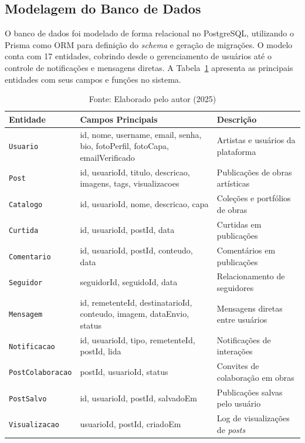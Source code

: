\documentclass[a4paper, 12pt, oneside]{article}
\begin{document}
\subsection{Modelagem do Banco de Dados}

O banco de dados foi modelado de forma relacional no PostgreSQL, utilizando o Prisma como ORM para definição do \textit{schema} e geração de migrações. O modelo conta com 17 entidades, cobrindo desde o gerenciamento de usuários até o controle de notificações e mensagens diretas. A Tabela~\ref{tab:entidades} apresenta as principais entidades com seus campos e funções no sistema.

\begin{table}[ht]
\centering
\caption{Principais entidades do banco de dados do Artlink}
\label{tab:entidades}
\begin{tabular}{lp{5.5cm}p{4cm}}
\toprule
\textbf{Entidade} & \textbf{Campos Principais} & \textbf{Descrição} \\
\midrule
\texttt{Usuario}         & id, nome, username, email, senha, bio, fotoPerfil, fotoCapa, emailVerificado & Artistas e usuários da plataforma \\
\texttt{Post}            & id, usuarioId, titulo, descricao, imagens, tags, visualizacoes & Publicações de obras artísticas \\
\texttt{Catalogo}        & id, usuarioId, nome, descricao, capa & Coleções e portfólios de obras \\
\texttt{Curtida}         & id, usuarioId, postId, data & Curtidas em publicações \\
\texttt{Comentario}      & id, usuarioId, postId, conteudo, data & Comentários em publicações \\
\texttt{Seguidor}        & seguidorId, seguidoId, data & Relacionamento de seguidores \\
\texttt{Mensagem}        & id, remetenteId, destinatarioId, conteudo, imagem, dataEnvio, status & Mensagens diretas entre usuários \\
\texttt{Notificacao}     & id, usuarioId, tipo, remetenteId, postId, lida & Notificações de interações \\
\texttt{PostColaboracao} & postId, usuarioId, status & Convites de colaboração em obras \\
\texttt{PostSalvo}       & id, usuarioId, postId, salvadoEm & Publicações salvas pelo usuário \\
\texttt{Visualizacao}    & usuarioId, postId, criadoEm & Log de visualizações de \textit{posts} \\
\bottomrule
\end{tabular}
\caption*{Fonte: Elaborado pelo autor (2025)}
\end{table}
\end{document}
